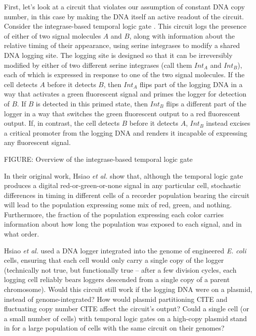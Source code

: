 \documentclass[preprint,12pt]{elsarticle}
\begin{document}
First, let's look at a circuit that violates our assumption of constant DNA copy number, in this case by making the DNA itself an active readout of the circuit. Consider the integrase-based temporal logic gate \citep{hsiao2016}. This circuit logs the presence of either of two signal molecules $A$ and $B$, along with information about the relative timing of their appearance, using serine integrases to modify a shared DNA logging site. The logging site is designed so that it can be irreversibly modified by either of two different serine integrases (call them $Int_A$ and $Int_B$), each of which is expressed in response to one of the two signal molecules. If the cell detects $A$ before it detects $B$, then $Int_A$ flips part of the logging DNA in a way that activates a green fluorescent signal and primes the logger for detection of $B$. If $B$ is detected in this primed state, then $Int_B$ flips a different part of the logger in a way that switches the green fluorescent output to a red fluorescent output. If, in contrast, the cell detects $B$ before it detects $A$, $Int_B$ instead excises a critical promoter from the logging DNA and renders it incapable of expressing any fluorescent signal. 

\vspace{.5in}
FIGURE: Overview of the integrase-based temporal logic gate
\vspace{.5in}

In their original work, Hsiao \emph{et al.} show that, although the temporal logic gate produces a digital red-or-green-or-none signal in any particular cell, stochastic differences in timing in different cells of a recorder population bearing the circuit will lead to the population expressing some mix of red, green, and nothing. Furthermore, the fraction of the population expressing each color carries information about how long the population was exposed to each signal, and in what order. 

Hsiao \emph{et al.} used a DNA logger integrated into the genome of engineered \emph{E. coli} cells, ensuring that each cell would only carry a single copy of the logger (technically not true, but functionally true -- after a few division cycles, each logging cell reliably bears loggers descended from a single copy of a parent chromosome). Would this circuit still work if the logging DNA were on a plasmid, instead of genome-integrated? How would plasmid partitioning {CITE} and fluctuating copy number {CITE} affect the circuit's output? Could a single cell (or a small number of cells) with temporal logic gates on a high-copy plasmid stand in for a large population of cells with the same circuit on their genomes? 
\end{document}
